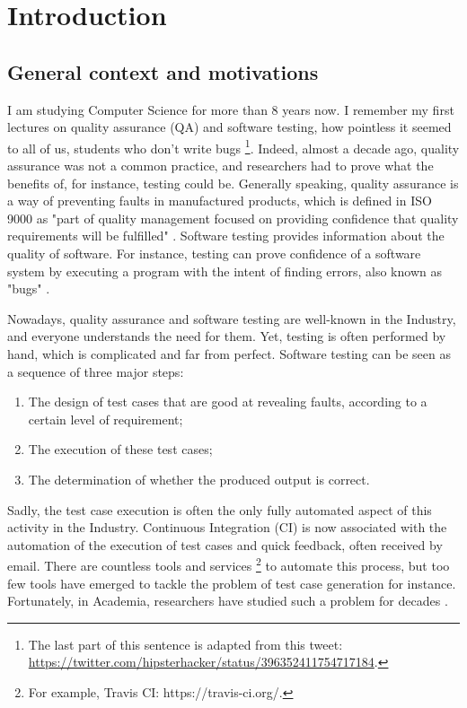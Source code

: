 %
\chapter{Introduction}
\label{sec:intro}

\minitoc

\section{General context and motivations}

I am studying Computer Science for more than 8 years now. I
remember my first lectures on quality assurance (QA) and software
testing, how pointless it seemed to all of us, students who don't
write bugs \footnote{The last part of this sentence is adapted
from this tweet:
\url{https://twitter.com/hipsterhacker/status/396352411754717184}.}.
Indeed, almost a decade ago, quality assurance was not a common
practice, and researchers had to prove what the benefits of, for
instance, testing could be. Generally speaking, quality assurance
is a way of preventing faults in manufactured products, which is
defined in ISO 9000 as "part of quality management focused on
providing confidence that quality requirements will be fulfilled"
\cite{iso20059000}. Software testing provides information about
the quality of software. For instance, testing can prove
confidence of a software system by executing a program with the
intent of finding errors, also known as "bugs"
\cite{Myers:1979:AST:539883}.

Nowadays, quality assurance and software testing are well-known
in the Industry, and everyone understands the need for them.
Yet, testing is often performed by hand, which is complicated
and far from perfect. Software testing can be seen as a sequence
of three major steps:

\begin{enumerate}
    \item The design of test cases that are good at revealing
        faults, according to a certain level of requirement;

    \item The execution of these test cases;

    \item The determination of whether the produced output is
        correct.
\end{enumerate}

Sadly, the test case execution is often the only fully automated
aspect of this activity in the Industry. Continuous Integration
(CI) \cite{booch1991object} is now associated with the automation
of the execution of test cases and quick feedback, often received
by email. There are countless tools and services
\footnote{For example, Travis CI: https://travis-ci.org/.} to
automate this process, but too few tools have emerged to tackle
the problem of test case generation for instance. Fortunately, in
Academia, researchers have studied such a problem for decades
\cite{4221614}.

